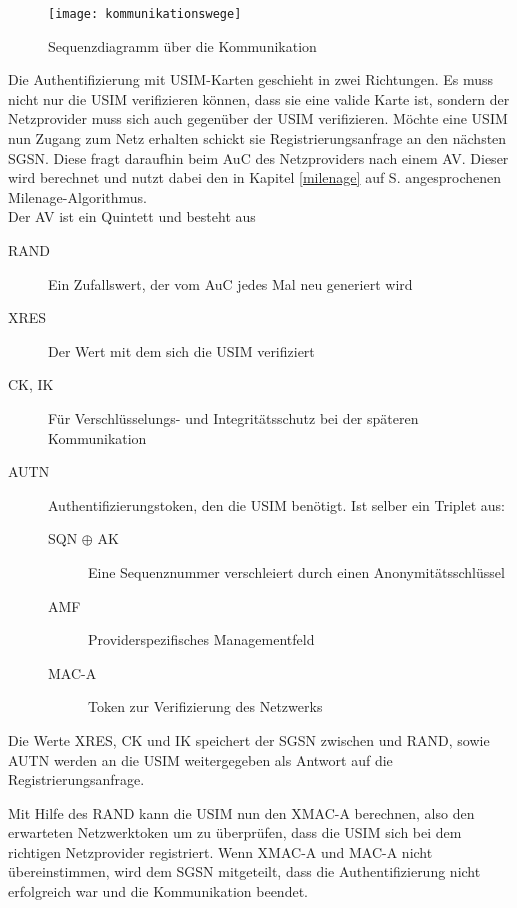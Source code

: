  \begin{figure}[htp]
 \begin{center}
  \texttt{[image: kommunikationswege]}
 \end{center}
 \caption[Sequenzdiagramm über die Kommunikation zwischen SIM-Karte und Authentication Center]{Sequenzdiagramm über die Kommunikation}
 \label{fig:kommunikationswege}
\end{figure}

 Die Authentifizierung mit \ac{USIM}-Karten geschieht in zwei Richtungen. Es muss nicht nur die
 USIM verifizieren können, dass sie eine valide Karte ist, sondern der Netzprovider muss sich auch
 gegenüber der USIM verifizieren. Möchte eine USIM nun Zugang zum Netz erhalten schickt sie
 Registrierungsanfrage an den nächsten \ac{SGSN}. Diese fragt daraufhin beim \ac{AuC} des
 Netzproviders nach einem \ac{AV}. Dieser wird berechnet und nutzt dabei den in Kapitel
 \ref{milenage} auf S. \pageref{milenage} angesprochenen Milenage-Algorithmus. \\
 Der AV ist ein Quintett und besteht aus
 
 \begin{description}
  \item [RAND] Ein Zufallswert, der vom AuC jedes Mal neu generiert wird
  \item [XRES] Der Wert mit dem sich die USIM verifiziert
  \item [CK, IK] Für Verschlüsselungs- und Integritätsschutz bei der späteren Kommunikation
  \item [AUTN] Authentifizierungstoken, den die USIM benötigt. Ist selber ein Triplet aus:
  \begin{description}
   \item [SQN $\oplus$ AK] Eine Sequenznummer verschleiert durch einen Anonymitätsschlüssel
   \item [AMF] Providerspezifisches Managementfeld
   \item [MAC-A] Token zur Verifizierung des Netzwerks
  \end{description}
 \end{description}
 
 Die Werte XRES, CK und IK speichert der SGSN zwischen und RAND, sowie AUTN werden an die USIM
 weitergegeben als Antwort auf die Registrierungsanfrage.

 Mit Hilfe des RAND kann die USIM nun den XMAC-A berechnen, also den erwarteten Netzwerktoken um zu überprüfen, dass die USIM sich bei dem richtigen Netzprovider registriert. Wenn XMAC-A
 und MAC-A nicht übereinstimmen, wird dem SGSN mitgeteilt, dass die Authentifizierung nicht erfolgreich
 war und die Kommunikation beendet.

